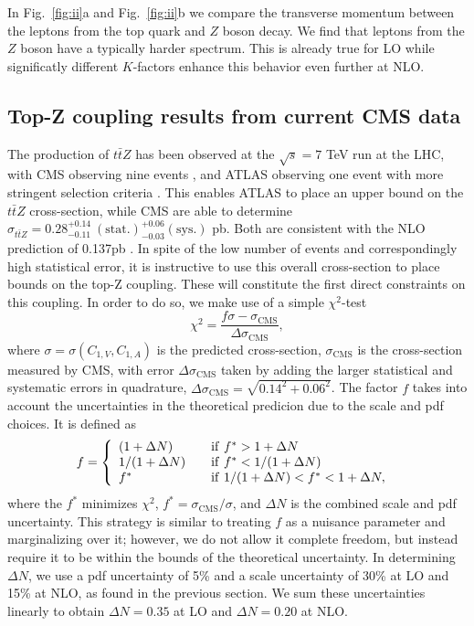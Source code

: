 \documentclass[preprint]{JHEP3} %
\def\ttbZ{t\bar{t}Z}
\begin{document}
In Fig.~\ref{fig:ii}a and Fig.~\ref{fig:ii}b we compare the transverse momentum between the leptons from the top quark and $Z$ boson decay.
We find that leptons from the $Z$ boson have a typically harder spectrum. 
This is already true for LO while significatly different $K$-factors enhance this behavior even further at NLO.


\subsection{Top-Z coupling results from current CMS data}
The production of $\ttbZ$ has been observed at the $\sqrt{s}=7$ TeV run at the LHC, with CMS observing nine events \cite{}, and ATLAS observing one event with more stringent selection criteria \cite{}. This enables ATLAS to place an upper bound on the $\ttbZ$ cross-section, while CMS are able to determine $\sigma_{\ttbZ} = 0.28^{+0.14}_{-0.11}~\mathrm{(stat.)}^{+0.06}_{-0.03} \mathrm{(sys.)}$ pb. Both are consistent with the NLO prediction of 0.137pb \cite{}. In spite of the low number of events and correspondingly high statistical error, it is instructive to use this overall cross-section to place bounds on the top-Z coupling. These will constitute the first direct constraints on this coupling.
In order to do so, we make use of a simple $\chi^2$-test 
\begin{equation}
\chi^2 = \frac{f \sigma - \sigma_{\mathrm{CMS}}}{\Delta \sigma_{\mathrm{CMS}}},
\end{equation}
where $\sigma=\sigma(C_{1,V},C_{1,A})$ is the predicted cross-section, $\sigma_{\mathrm{CMS}}$ is the cross-section measured by CMS, with error $\Delta \sigma_{\mathrm{CMS}}$ taken by adding the larger statistical and systematic errors in quadrature, $\Delta \sigma_{\mathrm{CMS}}=\sqrt{0.14^2+0.06^2}$. The factor $f$ takes into account the uncertainties in the theoretical predicion due to the scale and pdf choices. It is defined as
 \begin{equation}
f = \left\{ 
\begin{array} {l l}
(1+\Delta N)  & \quad \mathrm{if}~ f^* > 1 + \Delta N \\
1/(1+\Delta N)  & \quad \mathrm{if}~ f^* < 1/(1 + \Delta N) \\
f^* & \quad \mathrm{if}~ 1/(1 + \Delta N) < f^* < 1+\Delta N,
\end{array} \right.\ 
\end{equation}  
where the $f^*$ minimizes $\chi^2$, $f^* = \sigma_{\mathrm{CMS}} / \sigma$, and $\Delta N$ is the combined scale and pdf uncertainty. This strategy is similar to treating $f$ as a nuisance parameter and marginalizing over it; however, we do not allow it complete freedom, but instead require it to be within the bounds of the theoretical uncertainty. In determining $\Delta N$, we use a pdf uncertainty of 5\% and a scale uncertainty of 30\% at LO and 15\% at NLO, as found in the previous section. We sum these uncertainties linearly to obtain $\Delta N = 0.35$ at LO and $\Delta N = 0.20$ at NLO. 
\end{document}
